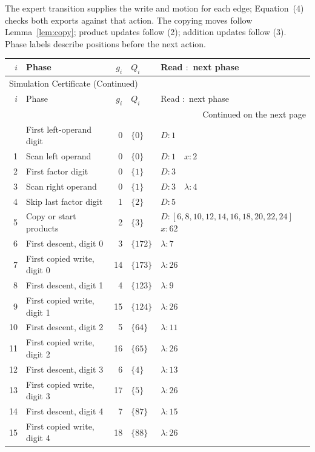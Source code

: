 \documentclass[11pt,a4paper]{article}
\newcommand{\blank}{\lambda}
\begin{document}
The expert transition supplies the write and motion for each edge;
Equation~(4) checks both exports against that action. The copying moves
follow Lemma~\ref{lem:copy}; product updates follow (2); addition updates
follow (3). Phase labels describe positions before the next action.
\begingroup
\fontsize{8.7}{10.5}\selectfont
\setlength{\tabcolsep}{3pt}
\renewcommand{\arraystretch}{1.17}
\begin{longtable}{r p{4.0cm} r l p{8.1cm}}
\toprule\rowcolor{Pale}
$i$ & Phase & $g_i$ & $Q_i$ & Read $:$ next phase\\\midrule
\endfirsthead
\multicolumn{5}{l}{\small\sffamily\color{Muted}Simulation Certificate (Continued)}\\[5pt]
\toprule\rowcolor{Pale}
$i$ & Phase & $g_i$ & $Q_i$ & Read $:$ next phase\\\midrule
\endhead
\midrule\multicolumn{5}{r}{\scriptsize Continued on the next page}\\
\endfoot
\bottomrule
\endlastfoot
0 & First left-operand digit & 0 & $\{0\}$ & $D:1$ \\
1 & Scan left operand & 0 & $\{0\}$ & $D:1\quad x:2$ \\
2 & First factor digit & 0 & $\{1\}$ & $D:3$ \\
3 & Scan right operand & 0 & $\{1\}$ & $D:3\quad \blank:4$ \\
4 & Skip last factor digit & 1 & $\{2\}$ & $D:5$ \\
5 & Copy or start products & 2 & $\{3\}$ & $D:[6,8,10,12,14,16,18,20,22,24]$\newline$x:62$ \\
6 & First descent, digit 0 & 3 & $\{172\}$ & $\blank:7$ \\
7 & First copied write, digit 0 & 14 & $\{173\}$ & $\blank:26$ \\
8 & First descent, digit 1 & 4 & $\{123\}$ & $\blank:9$ \\
9 & First copied write, digit 1 & 15 & $\{124\}$ & $\blank:26$ \\
10 & First descent, digit 2 & 5 & $\{64\}$ & $\blank:11$ \\
11 & First copied write, digit 2 & 16 & $\{65\}$ & $\blank:26$ \\
12 & First descent, digit 3 & 6 & $\{4\}$ & $\blank:13$ \\
13 & First copied write, digit 3 & 17 & $\{5\}$ & $\blank:26$ \\
14 & First descent, digit 4 & 7 & $\{87\}$ & $\blank:15$ \\
15 & First copied write, digit 4 & 18 & $\{88\}$ & $\blank:26$ \\

\end{longtable}
\end{document}
